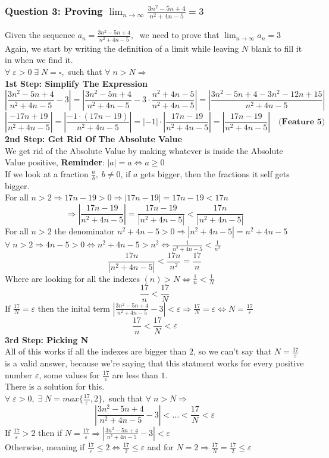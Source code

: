 \subsubsection{Question 3: Proving \(\lim_{n \to \infty} \frac{3n^2-5n+4}{n^2+4n-5} = 3\)}
Given the sequence $a_n = \frac{3n^2-5n+4}{n^2+4n-5},\;$ we need to prove that $\lim_{n\to\infty}a_n = 3$\\
Again, we start by writing the definition of a limit while leaving $N$ blank to fill it in when we find it.\\
$\forall\; \varepsilon>0\; \exists\;N = \square ,$ such that $\forall\; n>N\Longrightarrow$\\
\textbf{1st Step: Simplify The Expression}
\[
    |\frac{3n^2-5n+4}{n^2+4n-5}-3| = |\frac{3n^2-5n+4}{n^2+4n-5} -3\cdot\frac{n^2+4n-5}{n^2+4n-5}|=|\frac{3n^2-5n+4-3n^2-12n+15}{n^2+4n-5}|
\]
\[
    |\frac{-17n+19}{n^2+4n-5}| =|\frac{-1\cdot(17n-19)}{n^2+4n-5}| = |-1|\cdot|\frac{17n-19}{n^2+4n-5}| = |\frac{17n-19}{n^2+4n-5}| \quad \textbf{(Feature 5)}
\]
\textbf{2nd Step: Get Rid Of The Absolute Value}\\
We get rid of the Absolute Value by making whatever is inside the Absolute Value positive, \textbf{Reminder}: $|a| = a \iff a \geq 0$\\
If we look at a fraction $\frac{a}{b},\; b\neq 0$, if $a$ gets bigger, then the fractions it self gets bigger.\\
For all $n>2\Longrightarrow 17n-19>0 \Longrightarrow |17n-19|=17n-19<17n$
\[
    \Longrightarrow |\frac{17n-19}{n^2+4n-5}|=\frac{17n-19}{|n^2+4n-5|}<\frac{17n}{|n^2+4n-5|}
\]
For all $n>2$ the denominator $n^2+4n-5>0\Longrightarrow |n^2+4n-5| = n^2+4n-5$\\
$\forall\; n>2\Longrightarrow 4n-5>0 \iff n^2+4n-5>n^2\iff \frac{1}{n^2+4n-5}<\frac{1}{n^2}$ 
\[
    \frac{17n}{|n^2+4n-5|}<\frac{17n}{n^2}=\frac{17}{n}
\]
Where are looking for all the indexes $(n)>N \iff \frac{1}{n}<\frac{1}{N}$
\[
    \frac{17}{n}<\frac{17}{N}
\]
If $\frac{17}{N} = \varepsilon$ then the inital term $|\frac{3n^2-5n+4}{n^2+4n-5}-3|<\varepsilon \Longrightarrow \frac{17}{N}=\varepsilon \iff N=\frac{17}{\varepsilon}$
\[
    \frac{17}{n}<\frac{17}{N}<\varepsilon
\]
\textbf{3rd Step: Picking N}\\
All of this works if all the indexes are bigger than $2$, so we can't say that $N=\frac{17}{\varepsilon}$ is a valid answer, because we're saying that this statment works for every positive number $\varepsilon$, some values for $\frac{17}{\varepsilon}$ are less than $1$.\\
There is a solution for this.\\
$\forall\; \varepsilon>0 ,\; \exists\; N=max\{\frac{17}{\varepsilon},2\},$ such that $\forall\; n>N\Longrightarrow$
\[
    |\frac{3n^2-5n+4}{n^2+4n-5}-3|<\ldots<\frac{17}{N}<\varepsilon
\]
If $\frac{17}{\varepsilon}>2$ then if $N = \frac{17}{\varepsilon}\Longrightarrow |\frac{3n^2-5n+4}{n^2+4n-5}-3|<\varepsilon$\\
Otherwise, meaning if $\frac{17}{\varepsilon}\leq 2 \iff \frac{17}{2}\leq \varepsilon$ and for $N=2\Longrightarrow \frac{17}{N}=\frac{17}{2}\leq \varepsilon$\\



